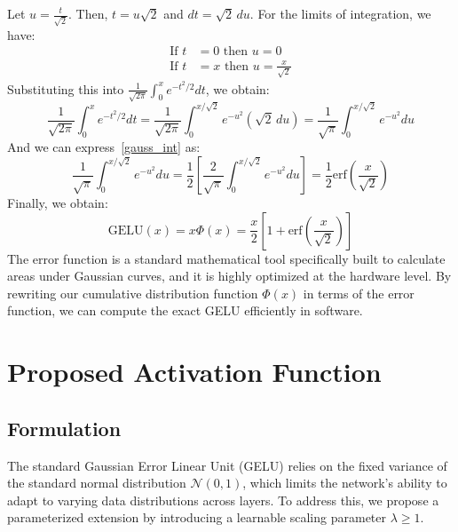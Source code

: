 \documentclass[11pt]{article}
\begin{document}
Let $u = \frac{t}{\sqrt{2}}$. Then, $t = u\sqrt{2}$ and $dt = \sqrt{2} \, du$. 
For the limits of integration, we have:
\begin{equation*}
\begin{aligned}
\text{If } t &= 0 \text{ then } u = 0 \\
\text{If } t &= x \text{ then } u = \frac{x}{\sqrt{2}}
\end{aligned}
\end{equation*}
Substituting this into $\frac{1}{\sqrt{2\pi}} \int_{0}^{x} e^{-t^2/2} dt$, we obtain:
\begin{equation}
\frac{1}{\sqrt{2\pi}} \int_{0}^{x} e^{-t^2/2} dt 
= \frac{1}{\sqrt{2\pi}} \int_{0}^{x/\sqrt{2}} e^{-u^2} (\sqrt{2} \, du) 
= \frac{1}{\sqrt{\pi}} \int_{0}^{x/\sqrt{2}} e^{-u^{2}} du 
\label{gauss_int}
\end{equation}
And we can express~\eqref{gauss_int} as:
\begin{equation*}
\frac{1}{\sqrt{\pi}} \int_{0}^{x/\sqrt{2}} e^{-u^{2}} du = \frac{1}{2} \left[ \frac{2}{\sqrt{\pi}} \int_{0}^{x/\sqrt{2}} e^{-u^{2}} du \right] = \frac{1}{2}\text{erf}\left(\frac{x}{\sqrt{2}}\right) 
\end{equation*}
Finally, we obtain:
\begin{equation*}
\text{GELU}(x) = x\Phi(x) =  \frac{x}{2}\left[1 + \text{erf}\left( \frac{x}{\sqrt{2}}\right) \right]
\end{equation*}
\noindent The error function is a standard mathematical tool specifically built to calculate areas under Gaussian curves, and it is highly optimized at the hardware level. By rewriting our cumulative distribution function $\Phi(x)$ in terms of the error function, we can compute the exact GELU efficiently in software.
\section{Proposed Activation Function}
\subsection{Formulation}

\noindent The standard Gaussian Error Linear Unit (GELU) relies on the fixed variance of the standard normal distribution $\mathcal{N}(0, 1)$, which limits the network's ability to adapt to varying data distributions across layers. To address this, we propose a parameterized extension by introducing a learnable scaling parameter $\lambda \geq 1$.\\
\end{document}
